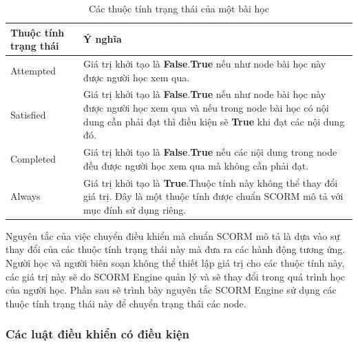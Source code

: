 \begin{table}[!htp]
	
	\begin{tabular}{|l|p{10.8cm}|}
		\hline 
		\textbf{Thuộc tính trạng thái} & \hspace{4.6cm}\textbf{Ý nghĩa}\\ 
		\hline 
		Attempted & Giá trị khởi tạo là \textbf{False}.\newline \textbf{True} nếu như node bài học này được người học xem qua.
		\\ 
		\hline 
		Satisfied & Giá trị khởi tạo là \textbf{False}.\newline \textbf{True} nếu như node bài học này được người học xem qua và nếu trong node bài học có nội dung cần phải đạt thì điều kiện sẽ \textbf{True} khi đạt các nội dung đó.
		\\ 
		\hline 
		Completed & Giá trị khởi tạo là \textbf{False}.\newline \textbf{True} nếu các nội dung trong node đều được người học xem qua mà không cần phải đạt.
		\\ 
		\hline 
		Always & Giá trị khởi tạo là \textbf{True}.\newline Thuộc tính này không thể thay đổi giá trị. Đây là một thuộc tính được chuẩn SCORM mô tả với mục đính sử dụng riêng.
		\\ 
		\hline 
	\end{tabular} 
	\caption{Các thuộc tính trạng thái của một bài học}
	\label{reftable41}
\end{table}



Nguyên tắc của việc chuyển điều khiển mà chuẩn SCORM mô tả là dựa vào sự thay đổi của các thuộc tính trạng thái này mà đưa ra các hành động tương ứng. Người học và người biên soạn không thể thiết lập giá trị cho các thuộc tính này, các giá trị này sẽ do SCORM Engine quản lý và sẽ thay đổi trong quá trình học của người học. Phần sau sẽ trình bày nguyên tắc SCORM Engine sử dụng các thuộc tính trạng thái này để chuyển trạng thái các node.\\


\subsubsection{Các luật điều khiển có điều kiện}

